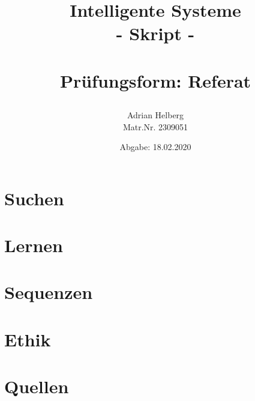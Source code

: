 \documentclass[11pt]{article}
\title{
\begin{center}
    \Huge \textbf{Intelligente Systeme}\\
    {\color{blue}- Skript -}\\~\\
    \Large Prüfungsform: Referat
\end{center}
}
\author{Adrian Helberg\\ Matr.Nr. 2309051}
\date{Abgabe: 18.02.2020}
\begin{document}
    \maketitle

    \tableofcontents

    \section{Suchen}
    \section{Lernen}
    \section{Sequenzen}
    \section{Ethik}
    \section{Quellen}
    
    
\end{document}
